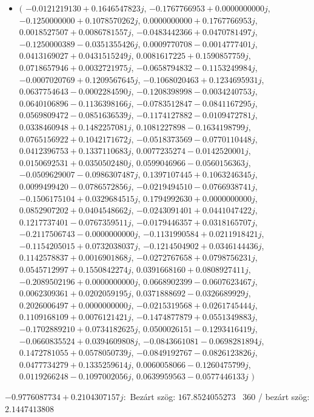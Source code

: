 \documentclass[14pt,a4paper]{article}
\begin{document}
\begin{itemize}
\item
$\big($
$-0.0121219130+0.1646547823j$, $-0.1767766953+0.0000000000j$, $-0.1250000000+0.1078570262j$, $0.0000000000+0.1767766953j$, $0.0018527507+0.0086781557j$, $-0.0483442366+0.0470781497j$, $-0.1250000389-0.0351355426j$, $0.0009770708-0.0014777401j$, $0.0413169027+0.0431515249j$, $0.0081617225+0.1590857759j$, $0.0718657946+0.0032721975j$, $-0.0658794832-0.1153249984j$, $-0.0007020769+0.1209567645j$, $-0.1068020463+0.1234695931j$, $0.0637754643-0.0002284590j$, $-0.1208398998-0.0034240753j$, $0.0640106896-0.1136398166j$, $-0.0783512847-0.0841167295j$, $0.0569809472-0.0851636539j$, $-0.1174127882-0.0109472781j$, $0.0338460948+0.1482257081j$, $0.1081227898-0.1634198799j$, $0.0765156922+0.1042171672j$, $-0.0518373569-0.0770110448j$, $0.0412396753+0.1337110683j$, $0.0077235274-0.0142520001j$, $0.0150692531+0.0350502480j$, $0.0599046966-0.0560156363j$, $-0.0509629007-0.0986307487j$, $0.1397107445+0.1063246345j$, $0.0099499420-0.0786572856j$, $-0.0219494510-0.0766938741j$, $-0.1506175104+0.0329684515j$, $0.1794992630+0.0000000000j$, $0.0852907202+0.0404548662j$, $-0.0243091401+0.0441047422j$, $0.1217737401-0.0767359511j$, $-0.0179446357+0.0318165707j$, $-0.2117506743-0.0000000000j$, $-0.1131990584+0.0211918421j$, $-0.1154205015+0.0732038037j$, $-0.1214504902+0.0346144436j$, $0.1142578837+0.0016901868j$, $-0.0272767658+0.0798756231j$, $0.0545712997+0.1550842274j$, $0.0391668160+0.0808927411j$, $-0.2089502196+0.0000000000j$, $0.0668902399-0.0607623467j$, $0.0062309361+0.0202059195j$, $0.0371888692-0.0326689929j$, $0.2026006497+0.0000000000j$, $-0.0215319568+0.0261745444j$, $0.1109168109+0.0076121421j$, $-0.1474877879+0.0551349883j$, $-0.1702889210+0.0734182625j$, $0.0500026151-0.1293416419j$, $-0.0660835524+0.0394609808j$, $-0.0843661081-0.0698281894j$, $0.1472781055+0.0578050739j$, $-0.0849192767-0.0826123826j$, $0.0477734279+0.1335259614j$, $0.0060058066-0.1260475799j$, $0.0119266248-0.1097002056j$, $0.0639959563-0.0577446133j$
$\big)$
\end{itemize}
$-0.9776087734+0.2104307157j$:\
Bezárt szög: $167.8524055273$ \
360 / bezárt szög: $2.1447413808$\
\end{document}
